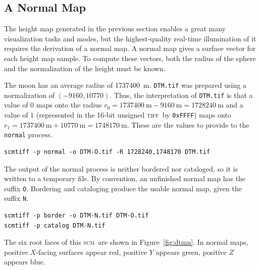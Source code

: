 \documentclass[oneside,10pt]{memoir}
\newcommand{\scm}     {\textsc{scm}}
\newcommand{\tiff}    {\textsc{tiff}}
\begin{document}
\begin{Spacing}{1.1}
\subsection{A Normal Map}
\label{sec:normal}

The height map generated in the previous section enables a great many visualization tasks and modes, but the highest-quality real-time illumination of it requires the derivation of a normal map. A normal map gives a surface vector for each height map sample. To compute these vectors, both the radius of the sphere and the normalization of the height must be known.

The moon has an average radius of \SI{1737400}{\meter}. \texttt{DTM.tif} was prepared using a normalization of $(\num{-9160},\num{10770})$. Thus, the interpretation of \texttt{DTM.tif} is that a value of $0$ maps onto the radius $r_0=\SI{1737400}{\meter}-\SI{9160}{\meter}=\SI{1728240}{\meter}$ and a value of $1$ (represented in the 16-bit unsigned \tiff\ by \texttt{0xFFFF}) maps onto $r_1=\SI{1737400}{\meter}+\SI{10770}{\meter}=\SI{1748170}{\meter}$. These are the values to provide to the \texttt{normal} process.

\begin{Verbatim}
scmtiff -p normal -o DTM-O.tif -R 1728240,1748170 DTM.tif
\end{Verbatim}

The output of the normal process is neither bordered nor cataloged, so it is written to a temporary file. By convention, an unfinished normal map has the suffix \texttt{O}. Bordering and cataloging produce the usable normal map, given the suffix \texttt{N}.

\begin{Verbatim}
scmtiff -p border -o DTM-N.tif DTM-O.tif
scmtiff -p catalog DTM-N.tif
\end{Verbatim}

The six root faces of this \scm\ are shown in Figure~\ref{fig:dtmn}. In normal maps, positive $X$-facing surfaces appear red, positive $Y$ appears green, positive $Z$ appears blue.


\end{Spacing}
\end{document}
